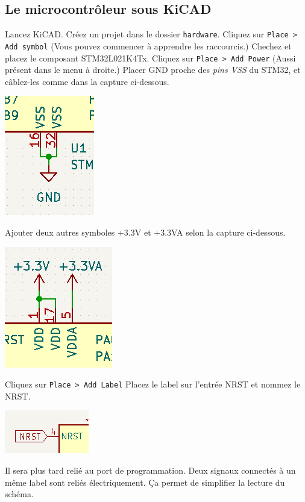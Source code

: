 \documentclass[12pt,%
addpoints,%
]{exam}
\begin{document}
\subsection{Le microcontrôleur sous KiCAD}
\begin{questions}
	\question Lancez KiCAD. Créez un projet dans le dossier \texttt{hardware}.
	\question Cliquez sur \texttt{Place > Add symbol} (Vous pouvez commencer à apprendre les raccourcis.)
	\question Chechez et placez le composant STM32L021K4Tx.
	\question Cliquez sur \texttt{Place > Add Power} (Aussi présent dans le menu à droite.)
	\question Placer GND proche des \emph{pins VSS} du STM32, et câblez-les comme dans la capture ci-dessous.\\
	\begin{center}
	\includegraphics[width=.2\linewidth]{figures/kicad03.png} 
	\end{center}
	\question Ajouter deux autres symboles +3.3V et +3.3VA selon la capture ci-dessous.\\
	\begin{center}
    \includegraphics[width=.2\linewidth]{figures/kicad04.png}
    \end{center}
	\question Cliquez sur \texttt{Place > Add Label}
		Placez le label sur l'entrée NRST et nommez le NRST.

	\begin{center}
		\includegraphics[width=.2\linewidth]{figures/kicad06.png}
	\end{center}

		Il sera plus tard relié au port de programmation.
		Deux signaux connectés à un même label sont reliés électriquement. Ça permet de simplifier la lecture du schéma.


\end{questions}
\end{document}
